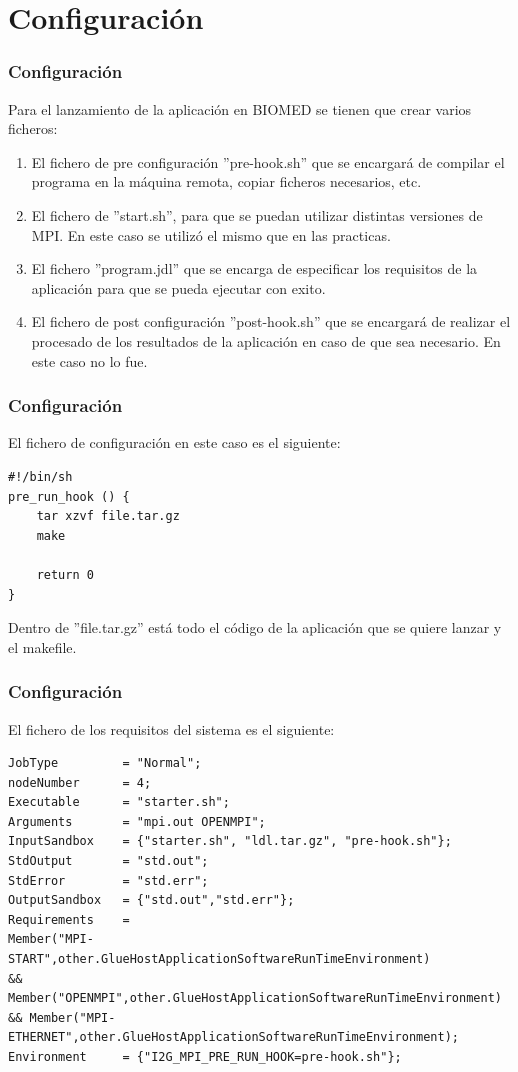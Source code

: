 \documentclass[10pt]{beamer}
\begin{document}
\section{Configuración}
\begin{frame}[fragile]
\frametitle{Configuración}

	Para el lanzamiento de la aplicación en BIOMED se tienen que crear varios ficheros:
    
\begin{enumerate}
\item El fichero de pre configuración ''pre-hook.sh'' que se encargará de compilar el programa en la máquina remota, copiar ficheros necesarios, etc.
\item El fichero de ''start.sh'', para que se puedan utilizar distintas versiones de MPI. En este caso se utilizó el mismo que en las practicas.
\item El fichero ''program.jdl'' que se encarga de especificar los requisitos de la aplicación para que se pueda ejecutar con exito.
\item El fichero de post configuración ''post-hook.sh'' que se encargará de realizar el procesado de los resultados de la aplicación en caso de que sea necesario. En este caso no lo fue.
\end{enumerate}
\end{frame}
\begin{frame}[fragile]
\frametitle{Configuración}
	El fichero de configuración en este caso es el siguiente:
\begin{lstlisting}[basicstyle=\ttfamily]
#!/bin/sh
pre_run_hook () {
    tar xzvf file.tar.gz
    make 
	
    return 0
}
\end{lstlisting}

Dentro de ''file.tar.gz'' está todo el código de la aplicación que se quiere lanzar y el makefile.

\end{frame}
\begin{frame}[fragile]
\frametitle{Configuración}
    El fichero de los requisitos del sistema es el siguiente:
\begin{lstlisting}[basicstyle=\ttfamily\tiny]
JobType         = "Normal";
nodeNumber      = 4;
Executable      = "starter.sh";
Arguments       = "mpi.out OPENMPI";
InputSandbox    = {"starter.sh", "ldl.tar.gz", "pre-hook.sh"};
StdOutput       = "std.out";
StdError        = "std.err";
OutputSandbox   = {"std.out","std.err"};
Requirements    =
Member("MPI-START",other.GlueHostApplicationSoftwareRunTimeEnvironment)
&& Member("OPENMPI",other.GlueHostApplicationSoftwareRunTimeEnvironment)
&& Member("MPI-ETHERNET",other.GlueHostApplicationSoftwareRunTimeEnvironment);
Environment 	= {"I2G_MPI_PRE_RUN_HOOK=pre-hook.sh"};

\end{lstlisting}
\end{frame}
\end{document}
